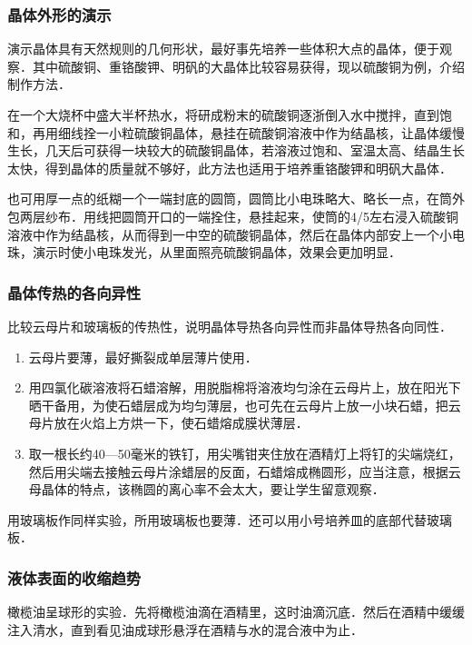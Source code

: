 \subsubsection{晶体外形的演示}

演示晶体具有天然规则的几何形状，最好事先培养一些体积大点的晶体，便于观察．其中硫酸铜、重铬酸钾、明矾的大晶体比较容易获得，现以硫酸铜为例，介绍制作方法．

在一个大烧杯中盛大半杯热水，将研成粉末的硫酸铜逐浙倒入水中搅拌，直到饱和，再用细线拴一小粒硫酸铜晶体，悬挂在硫酸铜溶液中作为结晶核，让晶体缓慢生长，几天后可获得一块较大的硫酸铜晶体，若溶液过饱和、室温太高、结晶生长太快，得到晶体的质量就不够好，此方法也适用于培养重铬酸钾和明矾大晶体．

也可用厚一点的纸糊一个一端封底的圆筒，圆筒比小电珠略大、略长一点，在筒外包两层纱布．用线把圆筒开口的一端拴住，悬挂起来，使筒的4/5左右浸入硫酸铜溶液中作为结晶核，从而得到一中空的硫酸铜晶体，然后在晶体内部安上一个小电珠，演示时使小电珠发光，从里面照亮硫酸铜晶体，效果会更加明显．

\subsubsection{晶体传热的各向异性}

比较云母片和玻璃板的传热性，说明晶体导热各向异性而非晶体导热各向同性．
\begin{enumerate}
    \item 云母片要薄，最好撕裂成单层薄片使用．
    \item 用四氯化碳溶液将石蜡溶解，用脱脂棉将溶液均匀涂在云母片上，放在阳光下晒干备用，为使石蜡层成为均匀薄层，也可先在云母片上放一小块石蜡，把云母片放在火焰上方烘一下，使石蜡熔成膜状薄层．
    \item 取一根长约40—50毫米的铁钉，用尖嘴钳夹住放在酒精灯上将钉的尖端烧红，然后用尖端去接触云母片涂蜡层的反面，石蜡熔成椭圆形，应当注意，根据云母晶体的特点，该椭圆的离心率不会太大，要让学生留意观察．
\end{enumerate}

用玻璃板作同样实验，所用玻璃板也要薄．还可以用小号培养皿的底部代替玻璃板．

\subsubsection{液体表面的收缩趋势}

橄榄油呈球形的实验．先将橄榄油滴在酒精里，这时油滴沉底．然后在酒精中缓缓注入清水，直到看见油成球形悬浮在酒精与水的混合液中为止．

